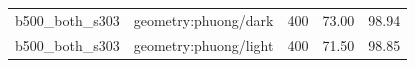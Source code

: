 \begin{longtable}{l>{\raggedright\arraybackslash}p{.42\linewidth}rrr}
b500\_\allowbreak{}both\_\allowbreak{}s303 & %
geometry:phuong/dark & %
400 & %
73.00 & %
98.94 \\ %

b500\_\allowbreak{}both\_\allowbreak{}s303 & %
geometry:phuong/light & %
400 & %
71.50 & %
98.85 \\ %


\end{longtable}
